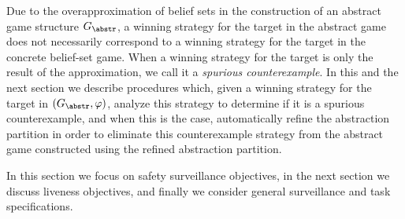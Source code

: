 Due to the overapproximation of belief sets in the construction of an abstract game structure $G_\abstr$,
a winning strategy for the target in the abstract game does not necessarily correspond to a winning strategy for the target in the concrete belief-set game. When a winning strategy for the target is only the result of the approximation, we call it a \emph{spurious counterexample}. In this and the next section we describe procedures which, given a winning strategy for the target in $(G_{\abstr},\varphi)$, analyze this strategy to determine if it is a spurious counterexample, and when this is the case, automatically refine the abstraction partition in order to eliminate this counterexample strategy from the abstract game constructed using the refined abstraction partition.

In this section we focus on safety surveillance objectives, in the next section we discuss liveness objectives, and finally we consider general surveillance and task specifications.
